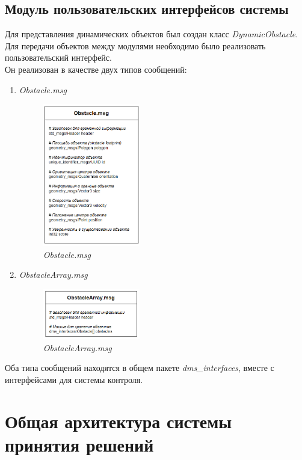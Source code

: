 \subsection{Модуль пользовательских интерфейсов системы}

Для представления динамических объектов был создан класс \textit{DynamicObstacle}. Для передачи объектов между модулями необходимо было реализовать пользовательский интерфейс. \\
Он реализован в качестве двух типов сообщений:
\begin{enumerate}
    \item \textit{Obstacle.msg}
\begin{figure}[H]
    \centering
    \includegraphics[width=0.4\textwidth]{images/chap_3/obstaclemsg.png}
    \caption{\textit{Obstacle.msg}}
    \label{fig:obstaclemsg}
\end{figure}
    \item \textit{ObstacleArray.msg}
\begin{figure}[H]
    \centering
    \includegraphics[width=0.4\textwidth]{images/chap_3/obstaclearraymsg.png}
    \caption{\textit{ObstacleArray.msg}}
    \label{fig:obstaclearraymsg}
\end{figure}
\end{enumerate}

Оба типа сообщений находятся в общем пакете \textit{dms\_interfaces}, вместе с интерфейсами для системы контроля.

\section{Общая архитектура системы принятия решений}

